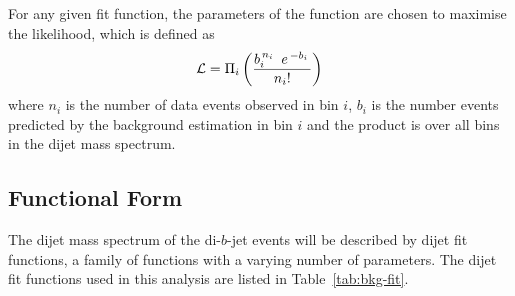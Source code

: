 For any given fit function, the parameters of the function are chosen to maximise the likelihood,
which is defined as
\begin{equation}
  \large {\ensuremath{\mathcal{L}}=  \Pi_i \left(  \frac{b_i^{\,n_i\,}~e^{\,-b_i\,}}{n_i!} \right)}
  \label{eqn:bkg-like}
\end{equation}
where $n_i$ is the number of data events observed in bin $i$,
$b_i$ is the number events predicted by the background estimation in bin $i$
and the product is over all bins in the dijet mass spectrum.

\vfill
\subsection{Functional Form}
\label{sec:bkg-func}



The dijet mass spectrum of the di-$b$-jet events will be described by dijet fit functions,
a family of functions with a varying number of parameters.
The dijet fit functions used in this analysis are listed in Table~\ref{tab:bkg-fit}.

